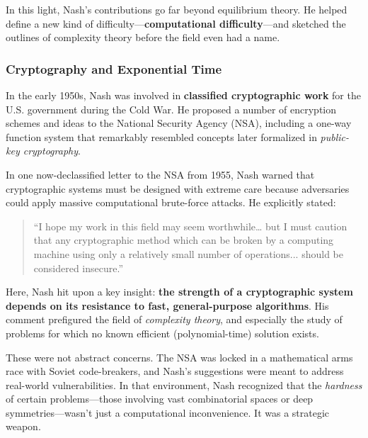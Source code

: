 In this light, Nash’s contributions go far beyond equilibrium theory. He helped define a new kind of difficulty—\textbf{computational difficulty}—and sketched the outlines of complexity theory before the field even had a name.

\subsubsection{Cryptography and Exponential Time}

In the early 1950s, Nash was involved in \textbf{classified cryptographic work} for the U.S. government during the Cold War. He proposed a number of encryption schemes and ideas to the National Security Agency (NSA), including a one-way function system that remarkably resembled concepts later formalized in \textit{public-key cryptography}.

In one now-declassified letter to the NSA from 1955, Nash warned that cryptographic systems must be designed with extreme care because adversaries could apply massive computational brute-force attacks. He explicitly stated:

\begin{quote}
``I hope my work in this field may seem worthwhile… but I must caution that any cryptographic method which can be broken by a computing machine using only a relatively small number of operations... should be considered insecure.''
\end{quote}

Here, Nash hit upon a key insight: \textbf{the strength of a cryptographic system depends on its resistance to fast, general-purpose algorithms}. His comment prefigured the field of \textit{complexity theory}, and especially the study of problems for which no known efficient (polynomial-time) solution exists.

These were not abstract concerns. The NSA was locked in a mathematical arms race with Soviet code-breakers, and Nash's suggestions were meant to address real-world vulnerabilities. In that environment, Nash recognized that the \textit{hardness} of certain problems—those involving vast combinatorial spaces or deep symmetries—wasn’t just a computational inconvenience. It was a strategic weapon.

